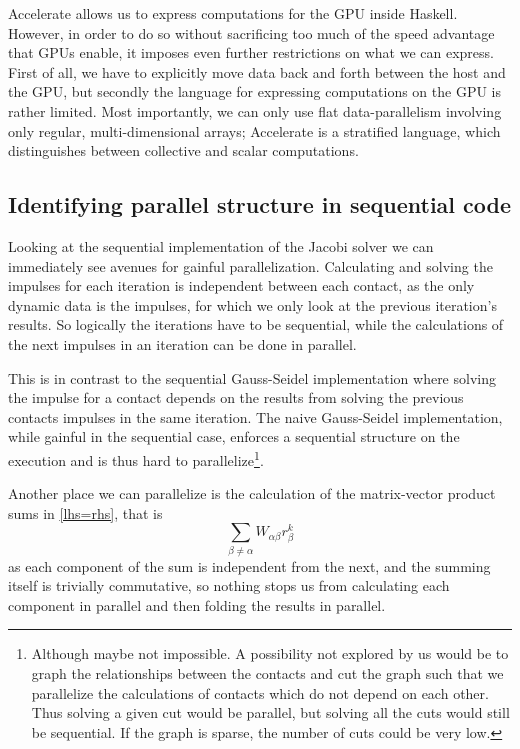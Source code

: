 \documentclass[runningheads,a4paper]{llncs}
\begin{document}
Accelerate allows us to express computations for the GPU inside
Haskell. However, in order to do so without sacrificing too much of the speed
advantage that GPUs enable, it imposes even further restrictions on what we can
express. First of all, we have to explicitly move data back and forth between
the host and the GPU, but secondly the language for expressing computations on
the GPU is rather limited. Most importantly, we can only use flat
data-parallelism involving only regular, multi-dimensional arrays; Accelerate
is a stratified language, which distinguishes between collective and scalar
computations.

\subsection{Identifying parallel structure in sequential code}
Looking at the sequential implementation
of the Jacobi solver
we can immediately see avenues for gainful parallelization.
Calculating and solving the impulses
for each iteration is independent between each contact,
as the only dynamic data is the impulses,
for which we only look at the previous iteration's results.
So logically the iterations have to be sequential,
while the calculations of the next impulses in an iteration
can be done in parallel.

This is in contrast to the sequential Gauss-Seidel implementation
where solving the impulse for a contact depends
on the results from solving the previous contacts impulses
in the same iteration.
The naive Gauss-Seidel implementation,
while gainful in the sequential case,
enforces a sequential structure on the execution
and is thus hard to parallelize\footnote{
  Although maybe not impossible. A possibility not explored by us
  would be to graph the relationships between the contacts
  and cut the graph such that we parallelize the calculations
  of contacts which do not depend on each other.
  Thus solving a given cut would be parallel,
  but solving all the cuts would still be sequential.
  If the graph is sparse, the number of cuts could be very low.}.

Another place we can parallelize is the calculation
of the matrix-vector product sums in \eqref{lhs=rhs},
that is \[\sum\limits_{\beta \neq \alpha} W_{\alpha\beta} r_\beta^k\]
as each component of the sum is independent from the next,
and the summing itself is trivially commutative,
so nothing stops us from calculating each component in parallel
and then folding the results in parallel.
\end{document}
